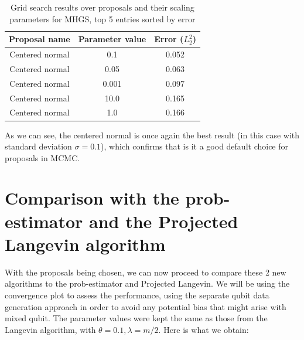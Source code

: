 \documentclass[12pt]{memoir}
\begin{document}
\begin{table}[H]


    \begin{center}

        \begin{tabular}{|c|c|c|}

            \hline

            Proposal name & Parameter value & Error ($L_2^2$)\\

            \hline\hline

            Centered normal& 0.1&0.052\\

            Centered normal& 0.05&0.063\\

            Centered normal& 0.001&0.097\\

            Centered normal& 10.0&0.165\\

            Centered normal& 1.0&0.166\\\hline

        \end{tabular}

\end{center}

\caption{Grid search results over proposals and their scaling parameters for MHGS, top 5 entries sorted by error}

\label{table:proposal-grid-search-mhgs}

\end{table}

As we can see, the centered normal is once again the best result (in this case with standard deviation $\sigma=0.1$), which confirms that is it a good default choice for proposals in MCMC.


\section{Comparison with the prob-estimator and the Projected Langevin algorithm}\label{section:mhs-mhgs-num-exp}

With the proposals being chosen, we can now proceed to compare these 2 new algorithms to the prob-estimator and Projected Langevin. We will be using the convergence plot to assess the performance, using the separate qubit data generation approach in order to avoid any potential bias that might arise with mixed qubit. The parameter values were kept the same as those from the Langevin algorithm, with $\theta=0.1,\lambda=m/2$. Here is what we obtain:\medbreak
\end{document}
